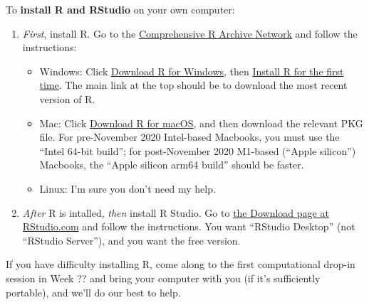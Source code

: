 \documentclass[
  a4paper,
]{book}
\providecommand{\tightlist}{%
  \setlength{\itemsep}{0pt}\setlength{\parskip}{0pt}}
\theoremstyle{definition}
\theoremstyle{definition}
\theoremstyle{definition}
\theoremstyle{remark}
\begin{document}
To \textbf{install R and RStudio} on your own computer:

\begin{enumerate}
\def\labelenumi{\arabic{enumi}.}
\tightlist
\item
  \emph{First}, install R. Go to the \href{https://cran.r-project.org/}{Comprehensive R Archive Network} and follow the instructions:

  \begin{itemize}
  \tightlist
  \item
    Windows: Click \href{https://cran.r-project.org/bin/windows/}{Download R for Windows}, then \href{https://cran.r-project.org/bin/windows/base/}{Install R for the first time}. The main link at the top should be to download the most recent version of R.
  \item
    Mac: Click \href{https://cran.r-project.org/bin/macosx/}{Download R for macOS}, and then download the relevant PKG file. For pre-November 2020 Intel-based Macbooks, you must use the ``Intel 64-bit build''; for post-November 2020 M1-based (``Apple silicon'') Macbooks, the ``Apple silicon arm64 build'' should be faster.
  \item
    Linux: I'm sure you don't need my help.
  \end{itemize}
\item
  \emph{After} R is intalled, \emph{then} install R Studio. Go to \href{https://www.rstudio.com/products/rstudio/download/\#download}{the Download page at RStudio.com} and follow the instructions. You want ``RStudio Desktop'' (not ``RStudio Server''), and you want the free version.
\end{enumerate}

If you have difficulty installing R, come along to the first computational drop-in session in Week ?? and bring your computer with you (if it's sufficiently portable), and we'll do our best to help.
\end{document}

